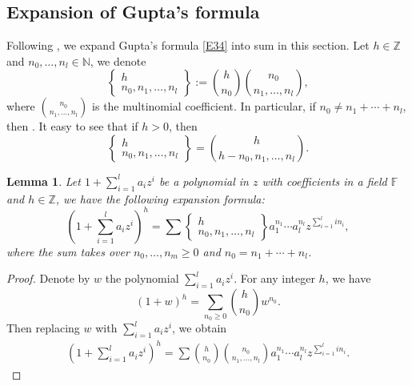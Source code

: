 \documentclass[pdftex]{sigma}
\newcommand{\Z}{\mathbb{Z}}
\newcommand{\N}{\mathbb{N}}
\numberwithin{equation}{section}
\newtheorem{Lemma}[Theorem]{Lemma}
\begin{document}
\subsection{Expansion of Gupta's formula}\label{S6}
Following \cite{LMN2023}, we expand Gupta's formula \eqref{E34} into sum in this section. Let $h\in \Z$ and $n_0,\dots, n_l\in \N$, we denote
\[\begin{Bmatrix}
 h\\
 n_0,n_1,\dots, n_l
\end{Bmatrix}:=\binom{h}{n_0}\binom{n_0}{n_1,\dots, n_l},
\]
where $\binom{n_0}{n_1,\dots, n_l}$ is the multinomial coefficient. In particular, if $n_0\neq n_1+\cdots +n_l$, then .
It easy to see that if $h>0$, then \[\begin{Bmatrix}
 h\\
 n_0,n_1,\dots, n_l
\end{Bmatrix}=\binom{h}{h-n_0,n_1,\dots, n_l}.\]
\begin{Lemma}\label{expansion of polynomial}
 Let $1+\sum_{i=1}^{l}a_iz^i$ be a polynomial in $z$ with coefficients in a field $\mathbb{F}$ and $h\in \Z$, we have the following expansion formula:
 \[
 \left(1+\sum\limits_{i=1}^{l}a_iz^i\right)^h=\sum\begin{Bmatrix}
 h\\
 n_0,n_1,\dots, n_l
\end{Bmatrix}a_1^{n_1}\cdots a_l^{n_l}z^{\sum\limits_{i=1}^{l} in_i},\]
where the sum takes over $n_0,\dots, n_m \geq 0$ and $n_0=n_1+\cdots+n_l$.
\end{Lemma}
\begin{proof}
 Denote by $w$ the polynomial $\sum_{i=1}^{l}a_iz^i$. For any integer $h$, we have \[(1+w)^{h}=\sum\limits_{n_0\ge 0}\binom{h}{n_0}w^{n_0}.\]
 Then replacing $w$ with $\sum_{i=1}^{l}a_iz^i$, we obtain
 \begin{align*}
 \left(1+\sum\limits_{i=1}^{l}a_iz^i\right)^h=\sum\binom{h}{n_0}\binom{n_0}{n_1,\dots,n_l}a_1^{n_1}\cdots a_l^{n_l}z^{\sum\limits_{i=1}^{l} in_i}.\tag*{\qed}
 \end{align*}\renewcommand{\qed}{}
\end{proof}
\end{document}

